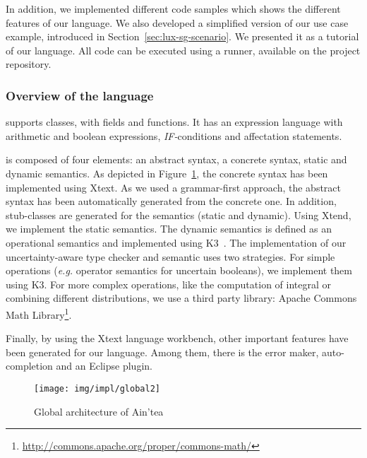 In addition, we implemented different code samples which shows the different features of our language.%
We also developed a simplified version of our use case example, introduced in Section~\ref{sec:lux-sg-scenario}.
We presented it as a tutorial of our language.%
All code can be executed using a runner, available on the project repository.%

\subsubsection{Overview of the language}
\languageName{} supports classes, with fields and functions.
It has an expression language with arithmetic and boolean expressions, \textit{IF-}conditions and affectation statements.

\languageName{} is composed of four elements: an abstract syntax, a concrete syntax, static and dynamic semantics.
As depicted in Figure~\ref{fig:global-lang-arch}, the concrete syntax has been implemented using Xtext.
As we used a grammar-first approach, the abstract syntax has been automatically generated from the concrete one.
In addition, stub-classes are generated for the semantics (static and dynamic).
Using Xtend, we implement the static semantics.  
The dynamic semantics is defined as an operational semantics and implemented using K3~\cite{DBLP:journals/sosym/JezequelCBMF15}. 
The implementation of our uncertainty-aware type checker and semantic uses two strategies.
For simple operations (\textit{e.g.} operator semantics for uncertain booleans), we implement them using K3.
For more complex operations, like the computation of integral or combining different distributions, we use a third party library: Apache Commons Math Library\footnote{\url{http://commons.apache.org/proper/commons-math/}}.

Finally, by using the Xtext language workbench, other important features have been generated for our language.
Among them, there is the error maker, auto-completion and an Eclipse plugin.

\begin{figure}
	\centering
	\texttt{[image: img/impl/global2]}
	\caption{Global architecture of Ain'tea}
	\label{fig:global-lang-arch}
\end{figure}

